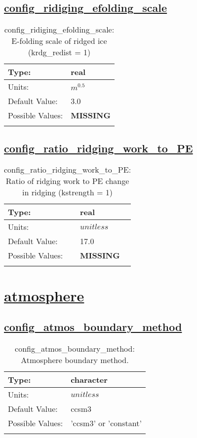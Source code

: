 \subsection[config\_ridiging\_efolding\_scale]{\hyperref[sec:nm_tab_ridging]{config\_ridiging\_efolding\_scale}}
\label{subsec:nm_sec_config_ridiging_efolding_scale}
\begin{center}
\begin{longtable}{| p{2.0in} || p{4.0in} |}
    \hline
    Type: & real \\
    \hline
    Units: & $m^0.5$ \\
    \hline
    Default Value: & 3.0 \\
    \hline
    Possible Values: & {\bf \color{red} MISSING} \\
    \hline
    \caption{config\_ridiging\_efolding\_scale: E-folding scale of ridged ice (krdg\_redist = 1)}
\end{longtable}
\end{center}
\subsection[config\_ratio\_ridging\_work\_to\_PE]{\hyperref[sec:nm_tab_ridging]{config\_ratio\_ridging\_work\_to\_PE}}
\label{subsec:nm_sec_config_ratio_ridging_work_to_PE}
\begin{center}
\begin{longtable}{| p{2.0in} || p{4.0in} |}
    \hline
    Type: & real \\
    \hline
    Units: & $unitless$ \\
    \hline
    Default Value: & 17.0 \\
    \hline
    Possible Values: & {\bf \color{red} MISSING} \\
    \hline
    \caption{config\_ratio\_ridging\_work\_to\_PE: Ratio of ridging work to PE change in ridging (kstrength = 1)}
\end{longtable}
\end{center}
\section[atmosphere]{\hyperref[sec:nm_tab_atmosphere]{atmosphere}}
\label{sec:nm_sec_atmosphere}
\subsection[config\_atmos\_boundary\_method]{\hyperref[sec:nm_tab_atmosphere]{config\_atmos\_boundary\_method}}
\label{subsec:nm_sec_config_atmos_boundary_method}
\begin{center}
\begin{longtable}{| p{2.0in} || p{4.0in} |}
    \hline
    Type: & character \\
    \hline
    Units: & $unitless$ \\
    \hline
    Default Value: & ccsm3 \\
    \hline
    Possible Values: & 'ccsm3' or 'constant' \\
    \hline
    \caption{config\_atmos\_boundary\_method: Atmosphere boundary method.}
\end{longtable}
\end{center}
